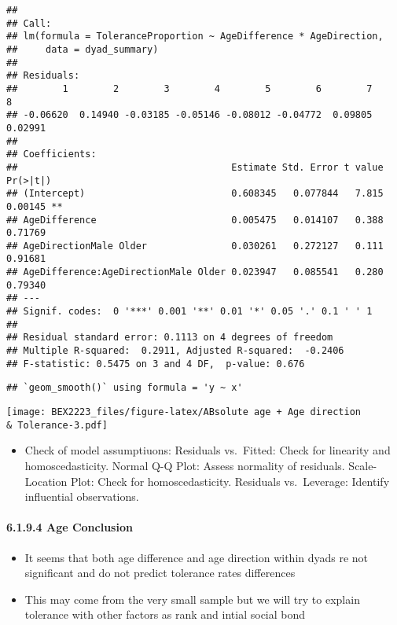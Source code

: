 \documentclass[
]{article}
\providecommand{\tightlist}{%
  \setlength{\itemsep}{0pt}\setlength{\parskip}{0pt}}
\begin{document}
\begin{verbatim}
## 
## Call:
## lm(formula = ToleranceProportion ~ AgeDifference * AgeDirection, 
##     data = dyad_summary)
## 
## Residuals:
##        1        2        3        4        5        6        7        8 
## -0.06620  0.14940 -0.03185 -0.05146 -0.08012 -0.04772  0.09805  0.02991 
## 
## Coefficients:
##                                      Estimate Std. Error t value Pr(>|t|)   
## (Intercept)                          0.608345   0.077844   7.815  0.00145 **
## AgeDifference                        0.005475   0.014107   0.388  0.71769   
## AgeDirectionMale Older               0.030261   0.272127   0.111  0.91681   
## AgeDifference:AgeDirectionMale Older 0.023947   0.085541   0.280  0.79340   
## ---
## Signif. codes:  0 '***' 0.001 '**' 0.01 '*' 0.05 '.' 0.1 ' ' 1
## 
## Residual standard error: 0.1113 on 4 degrees of freedom
## Multiple R-squared:  0.2911, Adjusted R-squared:  -0.2406 
## F-statistic: 0.5475 on 3 and 4 DF,  p-value: 0.676
\end{verbatim}

\begin{verbatim}
## `geom_smooth()` using formula = 'y ~ x'
\end{verbatim}

\texttt{[image: BEX2223\_files/figure-latex/ABsolute age + Age direction \\\& Tolerance-3.pdf]}

\begin{itemize}
\tightlist
\item
  Check of model assumptiuons: Residuals vs.~Fitted: Check for linearity
  and homoscedasticity. Normal Q-Q Plot: Assess normality of residuals.
  Scale-Location Plot: Check for homoscedasticity. Residuals
  vs.~Leverage: Identify influential observations.
\end{itemize}

\hypertarget{age-conclusion}{%
\paragraph{6.1.9.4 Age Conclusion}\label{age-conclusion}}

\begin{itemize}
\tightlist
\item
  It seems that both age difference and age direction within dyads re
  not significant and do not predict tolerance rates differences
\item
  This may come from the very small sample but we will try to explain
  tolerance with other factors as rank and intial social bond
\end{itemize}
\end{document}
